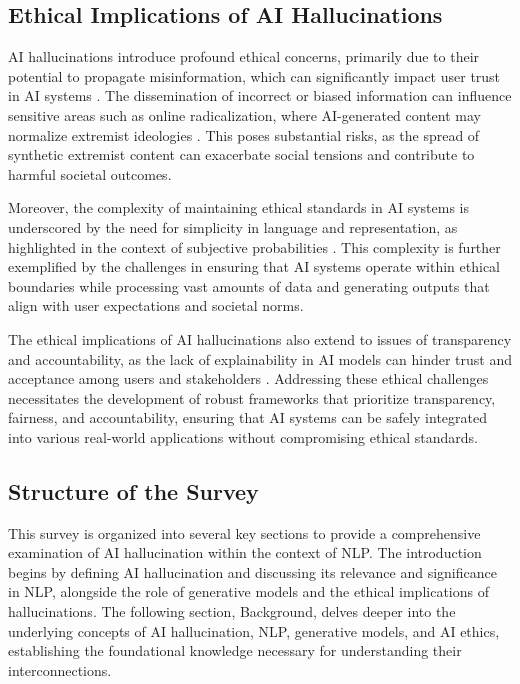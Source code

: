 \subsection{Ethical Implications of AI Hallucinations} \label{subsec:Ethical Implications of AI Hallucinations}

AI hallucinations introduce profound ethical concerns, primarily due to their potential to propagate misinformation, which can significantly impact user trust in AI systems \cite{pandy2024advancementsroboticsprocessautomation}. The dissemination of incorrect or biased information can influence sensitive areas such as online radicalization, where AI-generated content may normalize extremist ideologies \cite{mcguffie2020radicalizationrisksgpt3advanced}. This poses substantial risks, as the spread of synthetic extremist content can exacerbate social tensions and contribute to harmful societal outcomes.



Moreover, the complexity of maintaining ethical standards in AI systems is underscored by the need for simplicity in language and representation, as highlighted in the context of subjective probabilities \cite{cieslinski2022axiomstypefreesubjectiveprobability}. This complexity is further exemplified by the challenges in ensuring that AI systems operate within ethical boundaries while processing vast amounts of data and generating outputs that align with user expectations and societal norms.



The ethical implications of AI hallucinations also extend to issues of transparency and accountability, as the lack of explainability in AI models can hinder trust and acceptance among users and stakeholders \cite{wang2024espewrobustcopyrightprotection}. Addressing these ethical challenges necessitates the development of robust frameworks that prioritize transparency, fairness, and accountability, ensuring that AI systems can be safely integrated into various real-world applications without compromising ethical standards.



\subsection{Structure of the Survey} \label{subsec:Structure of the Survey}

This survey is organized into several key sections to provide a comprehensive examination of AI hallucination within the context of NLP. The introduction begins by defining AI hallucination and discussing its relevance and significance in NLP, alongside the role of generative models and the ethical implications of hallucinations. The following section, Background, delves deeper into the underlying concepts of AI hallucination, NLP, generative models, and AI ethics, establishing the foundational knowledge necessary for understanding their interconnections. 



